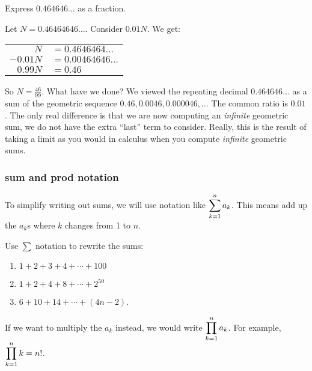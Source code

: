 \documentclass[12pt]{article}
\begin{document}
\begin{example}
  Express $0.464646\ldots$ as a fraction.

  \begin{solution}
    Let $N = 0.46464646\ldots$.  Consider $0.01N$.  We get:

    \begin{center}
    \begin{tabular}{rl}
     $N$ &$ = 0.4646464\ldots$\\
     $-0.01N$ &$ = 0.00464646\ldots$\\ \hline
     $0.99N$ & $ = 0.46$
    \end{tabular}
    \end{center}
    So $N = \frac{46}{99}$.  What have we done?  We viewed the repeating decimal $0.464646\ldots$ as a sum of the geometric sequence $0.46, 0.0046, 0.000046, \ldots$  The common ratio is $0.01$.  The only real difference is that we are now computing an {\em infinite} geometric sum, we do not have the extra ``last'' term to consider.  Really, this is the result of taking a limit as you would in calculus when you compute \emph{infinite} geometric sums.
  \end{solution}

\end{example}


\subsubsection*{\gls{sum} and \gls{prod} notation}

To simplify writing out sums, we will use notation like $\displaystyle\sum_{k=1}^n a_k$.  This means add up the $a_k$s where $k$ changes from 1 to $n$.

\begin{example}
  Use $\sum$ notation to rewrite the sums:
  \begin{enumerate}
    \item $1 + 2 + 3 + 4 + \cdots + 100$
    \item $1 + 2 + 4 + 8 + \cdots + 2^{50}$
    \item $6 + 10 + 14 + \cdots + (4n - 2)$.
  \end{enumerate}
\end{example}


If we want to multiply the $a_k$ instead, we would write $\displaystyle\prod_{k=1}^n a_k$.  For example, $\displaystyle\prod_{k=1}^n k = n!$.
\end{document}
